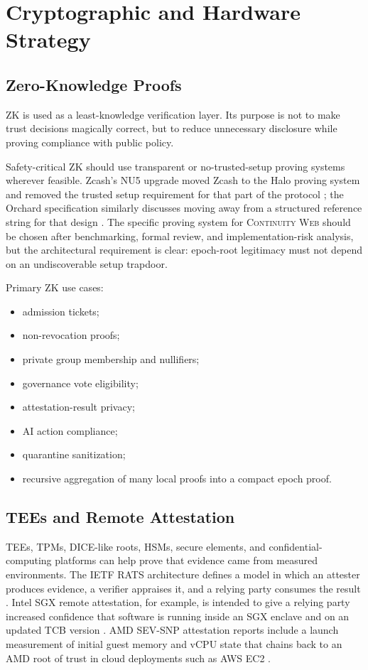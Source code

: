 \documentclass[11pt,letterpaper]{article}
\newcommand{\CW}{\textsc{Continuity Web}}
\begin{document}
\section{Cryptographic and Hardware Strategy}

\subsection{Zero-Knowledge Proofs}

ZK is used as a least-knowledge verification layer. Its purpose is not to make trust decisions magically correct, but to reduce unnecessary disclosure while proving compliance with public policy.

Safety-critical ZK should use transparent or no-trusted-setup proving systems wherever feasible. Zcash's NU5 upgrade moved Zcash to the Halo proving system and removed the trusted setup requirement for that part of the protocol \cite{zcash_nu5}; the Orchard specification similarly discusses moving away from a structured reference string for that design \cite{zcash_zip224}. The specific proving system for \CW{} should be chosen after benchmarking, formal review, and implementation-risk analysis, but the architectural requirement is clear: epoch-root legitimacy must not depend on an undiscoverable setup trapdoor.

Primary ZK use cases:

\begin{itemize}[leftmargin=1.4em]
\item admission tickets;
\item non-revocation proofs;
\item private group membership and nullifiers;
\item governance vote eligibility;
\item attestation-result privacy;
\item AI action compliance;
\item quarantine sanitization;
\item recursive aggregation of many local proofs into a compact epoch proof.
\end{itemize}

\subsection{TEEs and Remote Attestation}

TEEs, TPMs, DICE-like roots, HSMs, secure elements, and confidential-computing platforms can help prove that evidence came from measured environments. The IETF RATS architecture defines a model in which an attester produces evidence, a verifier appraises it, and a relying party consumes the result \cite{rfc9334}. Intel SGX remote attestation, for example, is intended to give a relying party increased confidence that software is running inside an SGX enclave and on an updated TCB version \cite{intel_sgx}. AMD SEV-SNP attestation reports include a launch measurement of initial guest memory and vCPU state that chains back to an AMD root of trust in cloud deployments such as AWS EC2 \cite{aws_sevsnp}.
\end{document}
